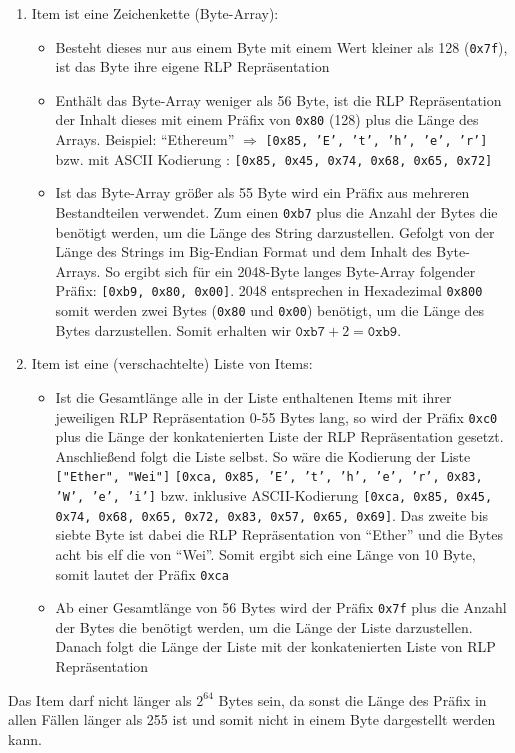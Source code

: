 \documentclass[runningheads]{llncs}
\begin{document}
\begin{enumerate}
  \item Item ist eine Zeichenkette (Byte-Array):
        \begin{itemize}
          \item Besteht dieses nur aus einem Byte mit einem Wert kleiner als 128 (\texttt{0x7f}), ist das Byte ihre eigene RLP Repräsentation
          \item Enthält das Byte-Array weniger als 56 Byte, ist die RLP Repräsentation der Inhalt dieses mit einem Präfix von \texttt{0x80} (128) plus die Länge des Arrays. Beispiel: "`Ethereum"' $\Rightarrow$ \texttt{[0x85, 'E', 't', 'h', 'e', 'r']} bzw. mit ASCII Kodierung : \texttt{[0x85, 0x45, 0x74, 0x68, 0x65, 0x72]}
          \item Ist das Byte-Array größer als 55 Byte wird ein Präfix aus mehreren Bestandteilen verwendet. Zum einen \texttt{0xb7} plus die Anzahl der Bytes die benötigt werden, um die Länge des String darzustellen. Gefolgt von der Länge des Strings im Big-Endian Format und dem Inhalt des Byte-Arrays. So ergibt sich für ein 2048-Byte langes Byte-Array folgender Präfix: \texttt{[0xb9, 0x80, 0x00]}.
                2048 entsprechen in Hexadezimal \texttt{0x800} somit werden zwei Bytes (\texttt{0x80} und \texttt{0x00}) benötigt, um die Länge des Bytes darzustellen. Somit erhalten wir $\texttt{0xb7} + 2 = \texttt{0xb9}$.
        \end{itemize}
  \item Item ist eine (verschachtelte) Liste von Items:
        \begin{itemize}
          \item Ist die Gesamtlänge alle in der Liste enthaltenen Items mit ihrer jeweiligen RLP Repräsentation 0-55 Bytes lang, so wird der Präfix \texttt{0xc0} plus die Länge der konkatenierten Liste der RLP Repräsentation gesetzt. Anschließend folgt die Liste selbst. So wäre die Kodierung der Liste \texttt{["Ether", "Wei"]} \texttt{[0xca, 0x85, 'E', 't', 'h', 'e', 'r', 0x83, 'W', 'e', 'i']} bzw. inklusive ASCII-Kodierung \texttt{[0xca, 0x85, 0x45, 0x74, 0x68, 0x65, 0x72, 0x83, 0x57, 0x65, 0x69]}. Das zweite bis siebte Byte ist dabei die RLP Repräsentation von "`Ether"' und die Bytes acht bis elf die von "`Wei"'. Somit ergibt sich eine Länge von 10 Byte, somit lautet der Präfix \texttt{0xca}
          \item Ab einer Gesamtlänge von 56 Bytes wird der Präfix \texttt{0x7f} plus die Anzahl der Bytes die benötigt werden, um die Länge der Liste darzustellen. Danach folgt die Länge der Liste mit der konkatenierten Liste von RLP Repräsentation
        \end{itemize}
\end{enumerate}
Das Item darf nicht länger als $2^{64}$ Bytes sein, da sonst die Länge des Präfix in allen Fällen länger als 255 ist und somit nicht in einem Byte dargestellt werden kann.
\end{document}
